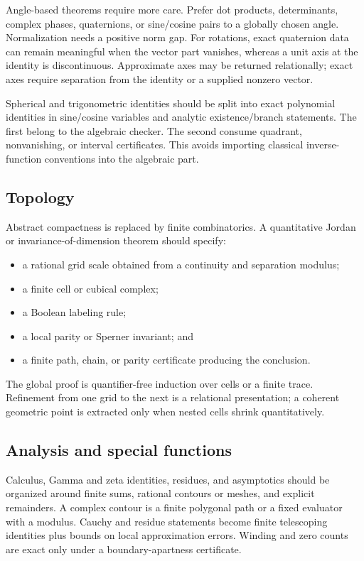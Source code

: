 Angle-based theorems require more care.  Prefer dot products, determinants,
complex phases, quaternions, or sine/cosine pairs to a globally chosen angle.
Normalization needs a positive norm gap.  For rotations, exact quaternion data
can remain meaningful when the vector part vanishes, whereas a unit axis at
the identity is discontinuous.  Approximate axes may be returned relationally;
exact axes require separation from the identity or a supplied nonzero vector.

Spherical and trigonometric identities should be split into exact polynomial
identities in sine/cosine variables and analytic existence/branch statements.
The first belong to the algebraic checker.  The second consume quadrant,
nonvanishing, or interval certificates.  This avoids importing classical
inverse-function conventions into the algebraic part.

\subsection{Topology}

Abstract compactness is replaced by finite combinatorics.  A quantitative
Jordan or invariance-of-dimension theorem should specify:

\begin{itemize}
\item a rational grid scale obtained from a continuity and separation modulus;
\item a finite cell or cubical complex;
\item a Boolean labeling rule;
\item a local parity or Sperner invariant; and
\item a finite path, chain, or parity certificate producing the conclusion.
\end{itemize}

The global proof is quantifier-free induction over cells or a finite trace.
Refinement from one grid to the next is a relational presentation; a coherent
geometric point is extracted only when nested cells shrink quantitatively.

\subsection{Analysis and special functions}

Calculus, Gamma and zeta identities, residues, and asymptotics should be
organized around finite sums, rational contours or meshes, and explicit
remainders.  A complex contour is a finite polygonal path or a fixed evaluator
with a modulus.  Cauchy and residue statements become finite telescoping
identities plus bounds on local approximation errors.  Winding and zero counts
are exact only under a boundary-apartness certificate.


